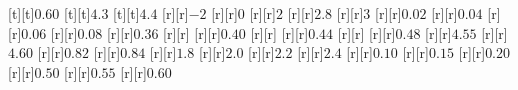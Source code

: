 \begin{psfrags}
[t][t]{$0.60$}%
[t][t]{$4.3$}%
[t][t]{$4.4$}%
%
[r][r]{$-2$}%
[r][r]{$0$}%
[r][r]{$2$}%
[r][r]{$2.8$}%
[r][r]{$3$}%
[r][r]{$0.02$}%
[r][r]{$0.04$}%
[r][r]{$0.06$}%
[r][r]{$0.08$}%
[r][r]{$0.36$}%
[r][r]{}%
[r][r]{$0.40$}%
[r][r]{}%
[r][r]{$0.44$}%
[r][r]{}%
[r][r]{$0.48$}%
[r][r]{$4.55$}%
[r][r]{$4.60$}%
[r][r]{$0.82$}%
[r][r]{$0.84$}%
[r][r]{$1.8$}%
[r][r]{$2.0$}%
[r][r]{$2.2$}%
[r][r]{$2.4$}%
[r][r]{$0.10$}%
[r][r]{$0.15$}%
[r][r]{$0.20$}%
[r][r]{$0.50$}%
[r][r]{$0.55$}%
[r][r]{$0.60$}%
%
%
\end{psfrags}%
%
